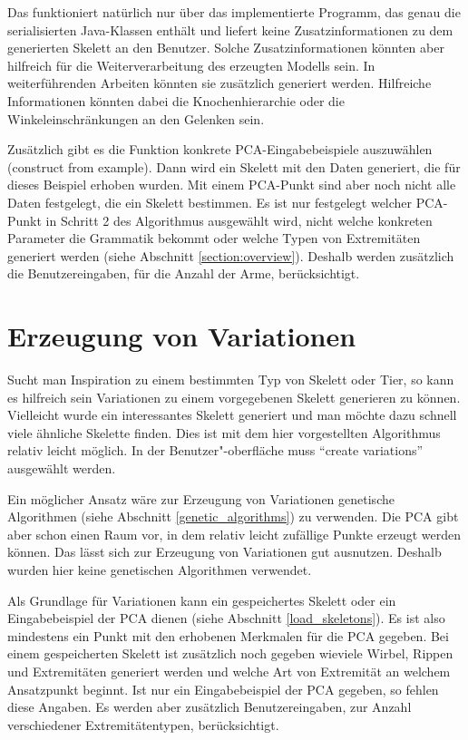 Das funktioniert natürlich nur über das implementierte Programm, das genau die serialisierten Java-Klassen enthält und liefert keine Zusatzinformationen zu dem generierten Skelett an den Benutzer. Solche Zusatzinformationen könnten aber hilfreich für die Weiterverarbeitung des erzeugten Modells sein. In weiterführenden Arbeiten könnten sie zusätzlich generiert werden. Hilfreiche Informationen könnten dabei \zb die Knochenhierarchie oder die Winkeleinschränkungen an den Gelenken sein.

Zusätzlich gibt es die Funktion konkrete PCA-Eingabebeispiele auszuwählen (construct from example). Dann wird ein Skelett mit den Daten generiert, die für dieses Beispiel erhoben wurden. Mit einem PCA-Punkt sind aber noch nicht alle Daten festgelegt, die ein Skelett bestimmen. Es ist nur festgelegt welcher PCA-Punkt in Schritt 2 des Algorithmus ausgewählt wird, nicht welche konkreten Parameter die Grammatik bekommt oder welche Typen von Extremitäten generiert werden (siehe Abschnitt \ref{section:overview}). Deshalb werden zusätzlich die Benutzereingaben, \zb für die Anzahl der Arme, berücksichtigt.


\section{Erzeugung von Variationen}

Sucht man Inspiration zu einem bestimmten Typ von Skelett oder Tier, so kann es hilfreich sein Variationen zu einem vorgegebenen Skelett generieren zu können. 
Vielleicht wurde ein interessantes Skelett generiert und man möchte dazu schnell viele ähnliche Skelette finden.
Dies ist mit dem hier vorgestellten Algorithmus relativ leicht möglich. In der Benutzer"-oberfläche muss "`create variations"' ausgewählt werden.

Ein möglicher Ansatz wäre zur Erzeugung von Variationen genetische Algorithmen (siehe Abschnitt \ref{genetic_algorithms}) zu verwenden. Die PCA gibt aber schon einen Raum vor, in dem relativ leicht zufällige Punkte erzeugt werden können. Das lässt sich zur Erzeugung von Variationen gut ausnutzen. Deshalb wurden hier keine genetischen Algorithmen verwendet. 

Als Grundlage für Variationen kann ein gespeichertes Skelett oder ein Eingabebeispiel der PCA dienen (siehe Abschnitt \ref{load_skeletons}). Es ist also mindestens ein Punkt mit den erhobenen Merkmalen für die PCA gegeben. Bei einem gespeicherten Skelett ist zusätzlich noch gegeben wieviele Wirbel, Rippen und Extremitäten generiert werden und welche Art von Extremität an welchem Ansatzpunkt beginnt.
Ist nur ein Eingabebeispiel der PCA gegeben, so fehlen diese Angaben. Es werden aber zusätzlich Benutzereingaben, \zb zur Anzahl verschiedener Extremitätentypen, berücksichtigt.

